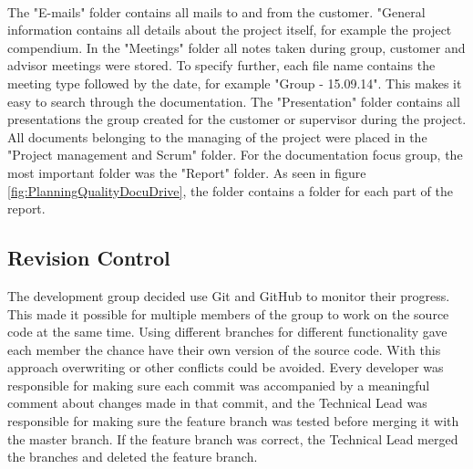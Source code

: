 \paragraph{} The "E-mails" folder contains all mails to and from the customer. "General information contains all details about the project itself, for example the project compendium. In the "Meetings" folder all notes taken during group, customer and advisor meetings were stored. To specify further, each file name contains the meeting type followed by the date, for example "Group - 15.09.14". This makes it easy to search through the documentation. The "Presentation" folder contains all presentations the group created for the customer or supervisor during the project. All documents belonging to the managing of the project were placed in the "Project management and Scrum" folder. For the documentation focus group, the most important folder was the "Report" folder. As seen in figure \ref{fig:PlanningQualityDocuDrive}, the folder contains a folder for each part of the report.

\subsection{Revision Control}
\label{subsec:PlanningQualityRev}
The development group decided use Git and GitHub to monitor their progress. This made it possible for multiple members of the group to work on the source code at the same time. 
Using different branches for different functionality gave each member the chance have their own version of the source code. With this approach overwriting or other conflicts could be avoided. Every developer was responsible for making sure each commit was accompanied by a meaningful comment about changes made in that commit, and the Technical Lead was responsible for making sure the feature branch was tested before merging it with the master branch. If the feature branch was correct, the Technical Lead merged the branches and deleted the feature branch.

